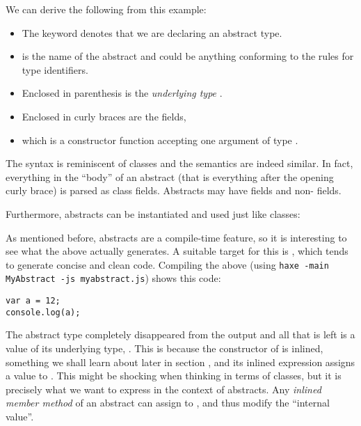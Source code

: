 We can derive the following from this example:

\begin{itemize}
	\item The keyword  denotes that we are declaring an abstract type.
	\item {} is the name of the abstract and could be anything conforming to the rules for type identifiers.
	\item Enclosed in parenthesis \expr{()} is the \emph{underlying type} .
	\item Enclosed in curly braces \expr{$\left\{\right\}$} are the fields,
	\item which is a constructor function  accepting one argument  of type .
\end{itemize}


The syntax is reminiscent of classes and the semantics are indeed similar. In fact, everything in the ``body'' of an abstract (that is everything after the opening curly brace) is parsed as class fields. Abstracts may have  fields and non-  fields.

Furthermore, abstracts can be instantiated and used just like classes:

As mentioned before, abstracts are a compile-time feature, so it is interesting to see what the above actually generates. A suitable target for this is , which tends to generate concise and clean code. Compiling the above (using \texttt{haxe -main MyAbstract -js myabstract.js}) shows this  code:

\begin{lstlisting}
var a = 12;
console.log(a);
\end{lstlisting}
The abstract type  completely disappeared from the output and all that is left is a value of its underlying type, . This is because the constructor of  is inlined, something we shall learn about later in section , and its inlined expression assigns a value to . This might be shocking when thinking in terms of classes, but it is precisely what we want to express in the context of abstracts. Any \emph{inlined member method} of an abstract can assign to , and thus modify the ``internal value''.

